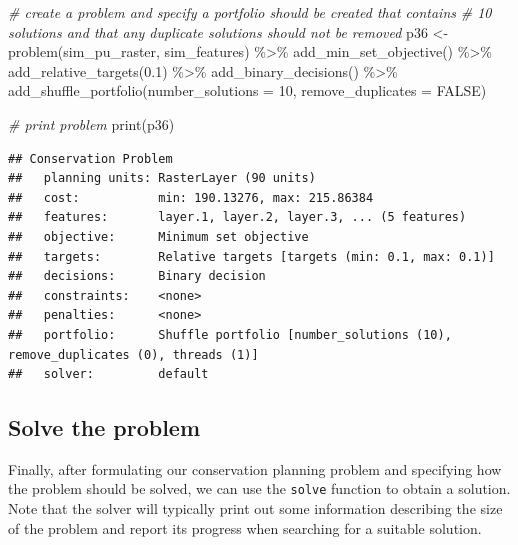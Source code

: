 \documentclass[
  12pt,
]{book}
\newenvironment{Shaded}{\begin{snugshade}}{\end{snugshade}}
\newcommand{\AttributeTok}[1]{\textcolor[rgb]{0.77,0.63,0.00}{#1}}
\newcommand{\CommentTok}[1]{\textcolor[rgb]{0.56,0.35,0.01}{\textit{#1}}}
\newcommand{\ConstantTok}[1]{\textcolor[rgb]{0.00,0.00,0.00}{#1}}
\newcommand{\DecValTok}[1]{\textcolor[rgb]{0.00,0.00,0.81}{#1}}
\newcommand{\FloatTok}[1]{\textcolor[rgb]{0.00,0.00,0.81}{#1}}
\newcommand{\FunctionTok}[1]{\textcolor[rgb]{0.00,0.00,0.00}{#1}}
\newcommand{\NormalTok}[1]{#1}
\newcommand{\OtherTok}[1]{\textcolor[rgb]{0.56,0.35,0.01}{#1}}
\newcommand{\SpecialCharTok}[1]{\textcolor[rgb]{0.00,0.00,0.00}{#1}}
\begin{document}
\begin{Shaded}
\begin{Highlighting}[]
\CommentTok{\# create a problem and specify a portfolio should be created that contains}
\CommentTok{\# 10 solutions and that any duplicate solutions should not be removed}
\NormalTok{p36 }\OtherTok{\textless{}{-}} \FunctionTok{problem}\NormalTok{(sim\_pu\_raster, sim\_features) }\SpecialCharTok{\%\textgreater{}\%}
  \FunctionTok{add\_min\_set\_objective}\NormalTok{() }\SpecialCharTok{\%\textgreater{}\%}
  \FunctionTok{add\_relative\_targets}\NormalTok{(}\FloatTok{0.1}\NormalTok{) }\SpecialCharTok{\%\textgreater{}\%}
  \FunctionTok{add\_binary\_decisions}\NormalTok{() }\SpecialCharTok{\%\textgreater{}\%}
  \FunctionTok{add\_shuffle\_portfolio}\NormalTok{(}\AttributeTok{number\_solutions =} \DecValTok{10}\NormalTok{, }\AttributeTok{remove\_duplicates =} \ConstantTok{FALSE}\NormalTok{)}

\CommentTok{\# print problem}
\FunctionTok{print}\NormalTok{(p36)}
\end{Highlighting}
\end{Shaded}

\begin{verbatim}
## Conservation Problem
##   planning units: RasterLayer (90 units)
##   cost:           min: 190.13276, max: 215.86384
##   features:       layer.1, layer.2, layer.3, ... (5 features)
##   objective:      Minimum set objective 
##   targets:        Relative targets [targets (min: 0.1, max: 0.1)]
##   decisions:      Binary decision 
##   constraints:    <none>
##   penalties:      <none>
##   portfolio:      Shuffle portfolio [number_solutions (10), remove_duplicates (0), threads (1)]
##   solver:         default
\end{verbatim}

\hypertarget{solve-the-problem}{%
\subsection{Solve the problem}\label{solve-the-problem}}

Finally, after formulating our conservation planning problem and specifying how the problem should be solved, we can use the \texttt{solve} function to obtain a solution. Note that the solver will typically print out some information describing the size of the problem and report its progress when searching for a suitable solution.
\end{document}
